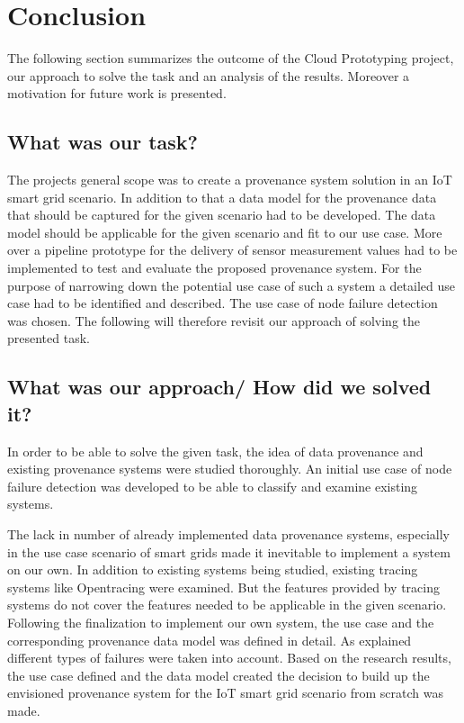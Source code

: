 \section{Conclusion}
The following section summarizes the outcome of the Cloud Prototyping project, our approach to solve the task and an analysis of the results. Moreover a motivation for future work is presented.
\subsection{What was our task?}
The projects general scope was to create a provenance system solution in an IoT smart grid scenario. In addition to that a data model for the provenance data that should be captured for the given scenario had to be developed. The data model should be applicable for the given scenario and fit to our use case. More over a pipeline prototype for the delivery of sensor measurement values had to be implemented to test and evaluate the proposed provenance system.
For the purpose of narrowing down the potential use case of such a system a detailed use case had to be identified and described. The use case of node failure detection was chosen.
The following will therefore revisit our approach of solving the presented task.
\subsection{What was our approach/ How did we solved it?}
In order to be able to solve the given task, the idea of data provenance and existing provenance systems were studied thoroughly. An initial use case of node failure detection was developed to be able to classify and examine existing systems. 

The lack in number of already implemented data provenance systems, especially in the use case scenario of smart grids made it inevitable to implement a system on our own. In addition to existing systems being studied, existing tracing systems like Opentracing were examined. But the features provided by tracing systems do not cover the features needed to be applicable in the given scenario. Following the finalization to implement our own system, the use case and the corresponding provenance data model was defined in detail. As explained different types of failures were taken into account. Based on the research results, the use case defined and the data model created the decision to build up the envisioned provenance system for the IoT smart grid scenario from scratch was made. 

